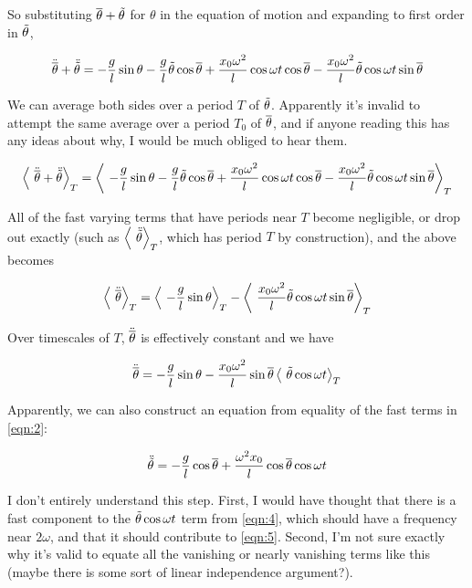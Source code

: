 \documentclass[12pt]{article}
\begin{document}
So substituting \(\overline{\theta}+\tilde{\theta}\) for \(\theta\) in the equation of motion and expanding to first order in \(\tilde{\theta}\),

\begin{equation} \label{eq:1}
\ddot{\overline{\theta}} + \ddot{\tilde{\theta}} = -\frac{g}{l}\sin\theta  - \frac{g}{l}\tilde{\theta}\cos\overline{\theta} + \frac{x_0\omega^2}{l}\cos\omega t\cos\overline{\theta} - \frac{x_0\omega^2}{l}\tilde{\theta}\cos\omega t\sin\overline{\theta}
\end{equation}

We can average both sides over a period \(T\) of \( \tilde{\theta} \). Apparently it's invalid to attempt the same average over a period \(T_0\) of \(\overline{\theta}\), and if anyone reading this has any ideas about why, I would be much obliged to hear them.

\begin{equation}\label{eqn:2}
\left\langle\ \ddot{\overline{\theta}} + \ddot{\tilde{\theta}} \right\rangle_T = \left\langle\ -\frac{g}{l}\sin\theta  - \frac{g}{l}\tilde{\theta}\cos\overline{\theta} + \frac{x_0\omega^2}{l}\cos\omega t\cos\overline{\theta} -  \frac{x_0\omega^2}{l}\tilde{\theta}\cos\omega t\sin\overline{\theta} \right\rangle_T
\end{equation}

All of the fast varying terms that have periods near \(T\) become negligible, or drop out exactly (such as \(\left\langle\ \ddot{\tilde{\theta}} \right\rangle_T\), which has period \(T\) by construction), and the above becomes 

\begin{equation}\label{eqn:3}\left\langle\ \ddot{\overline{\theta}} \right\rangle_T = \left\langle\ -\frac{g}{l}\sin\theta \right\rangle_T - \left\langle\ \frac{x_0\omega^2}{l}\tilde{\theta}\cos\omega t\sin\overline{\theta} \right\rangle_T
\end{equation}

Over timescales of \(T\), \(\ddot{\overline{\theta}}\) is effectively constant and we have 

\begin{equation}\label{eqn:4} \ddot{\overline{\theta}} = -\frac{g}{l}\sin\theta - \frac{x_0\omega^2}{l}\sin\overline{\theta}\left\langle\ \tilde{\theta}\cos\omega t \right\rangle_T
\end{equation}

Apparently, we can also construct an equation from equality of the fast terms in \ref{eqn:2}:

\begin{equation}\label{eqn:5}
\ddot{\tilde{\theta}} = -\frac{g}{l}\cos\overline{\theta} + \frac{\omega^2x_0}{l}\cos\overline{\theta}\cos\omega t
\end{equation}

I don't entirely understand this step. First, I would have thought that there is a fast component to the \(\tilde{\theta}\cos\omega t\) term from \ref{eqn:4}, which should have a frequency near \(2\omega\), and that it should contribute to \ref{eqn:5}. Second, I'm not sure exactly why it's valid to equate all the vanishing or nearly vanishing terms like this (maybe there is some sort of linear independence argument?).
\end{document}

